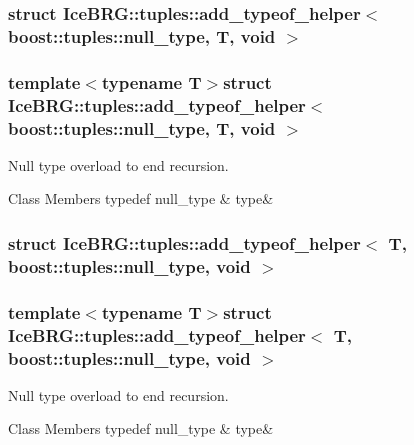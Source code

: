 \subsubsection{struct Ice\+B\+R\+G\+:\+:tuples\+:\+:add\+\_\+typeof\+\_\+helper$<$ boost\+:\+:tuples\+:\+:null\+\_\+type, T, void $>$}
\subsubsection*{template$<$typename T$>$struct Ice\+B\+R\+G\+::tuples\+::add\+\_\+typeof\+\_\+helper$<$ boost\+::tuples\+::null\+\_\+type, T, void $>$}

Null type overload to end recursion. \begin{DoxyFields}{Class Members}
\hypertarget{namespaceIceBRG_1_1tuples_a0503c150c599461739fa22e618e07ece}{}typedef null\+\_\+type\label{namespaceIceBRG_1_1tuples_a0503c150c599461739fa22e618e07ece}
&
type&
\\
\hline

\end{DoxyFields}
\label{structIceBRG_1_1tuples_1_1add__typeof__helper_3_01T_00_01boost_1_1tuples_1_1null__type_00_01void_01_4}
\hypertarget{namespaceIceBRG_1_1tuples_structIceBRG_1_1tuples_1_1add__typeof__helper_3_01T_00_01boost_1_1tuples_1_1null__type_00_01void_01_4}{}
\subsubsection{struct Ice\+B\+R\+G\+:\+:tuples\+:\+:add\+\_\+typeof\+\_\+helper$<$ T, boost\+:\+:tuples\+:\+:null\+\_\+type, void $>$}
\subsubsection*{template$<$typename T$>$struct Ice\+B\+R\+G\+::tuples\+::add\+\_\+typeof\+\_\+helper$<$ T, boost\+::tuples\+::null\+\_\+type, void $>$}

Null type overload to end recursion. \begin{DoxyFields}{Class Members}
\hypertarget{namespaceIceBRG_1_1tuples_a061219a3f5427911524ac770ddc232eb}{}typedef null\+\_\+type\label{namespaceIceBRG_1_1tuples_a061219a3f5427911524ac770ddc232eb}
&
type&
\\
\hline

\end{DoxyFields}
\label{structIceBRG_1_1tuples_1_1add__typeof__helper_3_01T1_00_01T2_00_01BRG__S__IS__TUPLE_07T1_08_00_01BRG__S__IS__TUPLE_07T2_08_4}
\hypertarget{namespaceIceBRG_1_1tuples_structIceBRG_1_1tuples_1_1add__typeof__helper_3_01T1_00_01T2_00_01BRG__S__IS__TUPLE_07T1_08_00_01BRG__S__IS__TUPLE_07T2_08_4}{}
